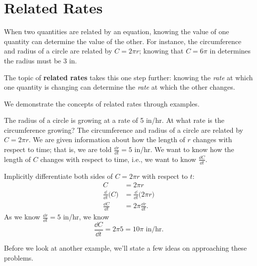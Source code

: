 \section{Related Rates}\label{sec:related_rates}

When two quantities are related by an equation, knowing the value of one quantity can determine the value of the other. For instance, the circumference and radius of a circle are related by $C=2\pi r$; knowing that $C = 6\pi$ in determines the radius must be 3 in.

The topic of \textbf{related rates} takes this one step further: knowing the \emph{rate} at which one quantity is changing can determine the \emph{rate} at which the other changes.



We demonstrate the concepts of related rates through examples.

\begin{example}\label{ex_rr1}%
The radius of a circle is growing at a rate of 5 in/hr. At what rate is the circumference growing?
\solution
The circumference and radius of a circle are related by $C = 2\pi r$. We are given information about how the length of $r$ changes with respect to time; that is, we are told $\frac{\dd r}{\dd t} = 5$ in/hr. We want to know how the length of $C$ changes with respect to time, i.e., we want to know $\frac{\dd C}{\dd t}$. 

Implicitly differentiate both sides of $C = 2\pi r$ with respect to $t$:
\begin{align*}
C 	&= 2\pi r\\
\frac{\dd}{\dd t}\bigl(C\bigr) &= \frac{\dd}{\dd t}\bigl(2\pi r\bigr) \\
\frac{\dd C}{\dd t} &= 2\pi\frac{\dd r}{\dd t}.
\end{align*}
As we know $\frac{\dd r}{\dd t} = 5$ in/hr, we know
\[
 \frac{\dd C}{\dd t} = 2\pi 5 = 10\pi %
 \text{ in/hr.}
\]
\end{example}

Before we look at another example, we'll state a few ideas on approaching these problems.

